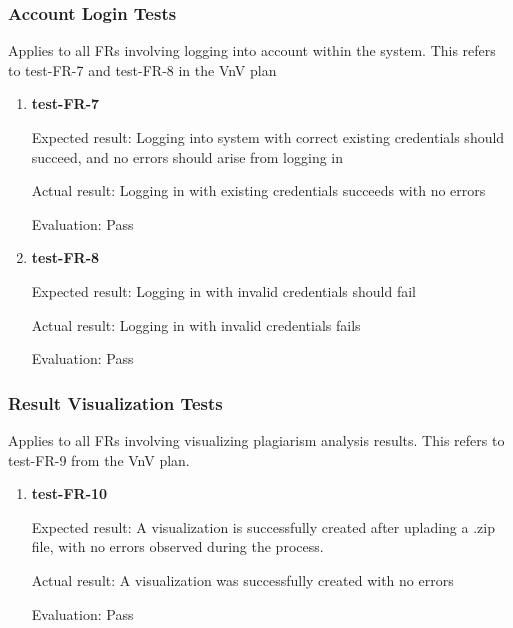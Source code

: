 \documentclass[12pt, titlepage]{article}
\begin{document}
\subsubsection{Account Login Tests}

Applies to all FRs involving logging into account within the system. This refers
to test-FR-7 and test-FR-8 in the VnV plan

\begin{enumerate}

\item{\textbf{test-FR-7}}

Expected result: Logging into system with correct existing credentials should
succeed, and no errors should arise from logging in

Actual result: Logging in with existing credentials succeeds with no errors

Evaluation: Pass

\item{\textbf{test-FR-8}}

Expected result: Logging in with invalid credentials should fail

Actual result: Logging in with invalid credentials fails

Evaluation: Pass
					
\end{enumerate}

\subsubsection{Result Visualization Tests}

Applies to all FRs involving visualizing plagiarism analysis results. This refers to test-FR-9 from the VnV plan.


\begin{enumerate}

\item{\textbf{test-FR-10}}
			
Expected result: A visualization is successfully created after uplading a .zip
file, with no errors observed during the process.

Actual result: A visualization was successfully created with no errors

Evaluation: Pass

\end{enumerate}
\end{document}
